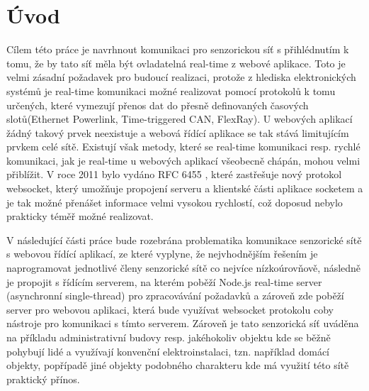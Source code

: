 \chapter{Úvod}
Cílem této práce je navrhnout komunikaci pro senzorickou síť s přihlédnutím k tomu, že by tato síť měla být ovladatelná real-time z webové aplikace. Toto je velmi zásadní požadavek pro budoucí realizaci, protože z hlediska elektronických systémů je real-time komunikaci možné realizovat pomocí protokolů k tomu určených, které vymezují přenos dat do přesně definovaných časových slotů(Ethernet Powerlink, Time-triggered CAN, FlexRay). U webových aplikací žádný takový prvek neexistuje a webová řídící aplikace se tak stává limitujícím prvkem celé sítě. Existují však metody, které se real-time komunikaci resp. rychlé komunikaci, jak je real-time u webových aplikací všeobecně chápán, mohou velmi přiblížit. V roce 2011 bylo vydáno RFC 6455 \cite{rfc6455}, které zastřešuje nový protokol websocket, který umožňuje propojení serveru a klientské části aplikace socketem a je tak možné přenášet informace velmi vysokou rychlostí, což doposud nebylo prakticky téměř možné realizovat.

V následující části práce bude rozebrána problematika komunikace senzorické sítě s webovou řídící aplikací, ze které vyplyne, že nejvhodnějším řešením je naprogramovat jednotlivé členy senzorické sítě co nejvíce nízkoúrovňově, následně je propojit s řídícím serverem, na kterém poběží Node.js real-time server (asynchronní single-thread) pro zpracovávání požadavků a zároveň zde poběží server pro webovou aplikaci, která bude využívat websocket protokolu coby nástroje pro komunikaci s tímto serverem. Zároveň je tato senzorická síť uváděna na příkladu administrativní budovy resp. jakéhokoliv objektu kde se běžně pohybují lidé a využívají konvenční elektroinstalaci, tzn. například domácí objekty, popřípadě jiné objekty podobného charakteru kde má využití této sítě praktický přínos.
